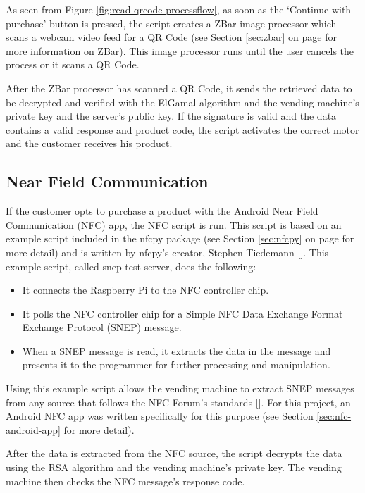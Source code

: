 As seen from Figure \ref{fig:read-qrcode-processflow}, as soon as the `Continue
with purchase' button is pressed, the script creates a ZBar image processor
which scans a webcam video feed for a QR Code (see Section \ref{sec:zbar} on page
\pageref{sec:zbar} for more information on ZBar). This image processor runs until the user
cancels the process or it scans a QR Code. 

After the ZBar processor has scanned a QR Code, it sends the retrieved data to
be decrypted and verified with the ElGamal algorithm and the vending machine's
private key and the server's public key. If the signature is valid and the data
contains a valid response and product code, the script activates the correct
motor and the customer receives his product. 

\subsection{Near Field Communication}

If the customer opts to purchase a product with the Android Near Field
Communication (NFC) app, the NFC script is run. This script is based on an
example script included in the nfcpy package (see Section \ref{sec:nfcpy} on page
\pageref{sec:nfcpy} for more detail) and is written by nfcpy's creator, Stephen Tiedemann
[\cite{website:nfcpy}]. This example script, called snep-test-server, does the
following:

\begin{itemize}
  \item It connects the Raspberry Pi to the NFC controller chip.
  \item It polls the NFC controller chip for a Simple NFC Data Exchange Format
  Exchange Protocol (SNEP) message.
  \item When a SNEP message is read, it extracts the data in the message and
  presents it to the programmer for further processing and manipulation.
\end{itemize}

Using this example script allows the vending machine to extract SNEP messages
from any source that follows the NFC Forum's standards
[\cite{website:nfc-forum}]. For this project, an Android NFC app was written
specifically for this purpose (see Section \ref{sec:nfc-android-app} for more
detail). 

After the data is extracted from the NFC source, the script decrypts the data
using the RSA algorithm and the vending machine's private key. The vending
machine then checks the NFC message's response code. 

